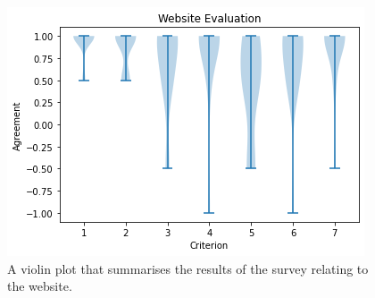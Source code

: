 \begin{figure}[H]
    \centering
    \includegraphics[scale=0.75]{data/website-evaluation.png}
    \caption{A violin plot that summarises the results of the survey relating to the website.}
\end{figure}






